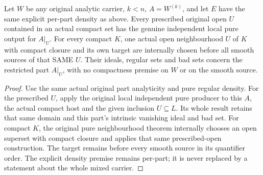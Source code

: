 \begin{theorem}
\label{hir:original-dimension-part-own-local-canonical-family}
\leanok
Let $W$ be any original analytic carrier, $k<n$, $A=W^{(k)}$,
and let $E$ have the same explicit per-part density as above.
Every prescribed original open $U$ contained in an actual compact
set has the genuine independent local pure output for $A|_U$.
For every compact $K$, one actual open neighbourhood $U$ of $K$
with compact closure and its own target are internally chosen before
all smooth sources of that SAME $U$. Their ideals, regular sets and
bad sets concern the restricted part $A|_U$, with no compactness
premise on $W$ or on the smooth source.
\end{theorem}
\begin{proof}
Use the same actual original part analyticity and pure regular density.
For the prescribed $U$, apply the original local independent pure
producer to this $A$, the actual compact host and the given inclusion
$U\subseteq L$. Its whole result retains that same domain and this
part's intrinsic vanishing ideal and bad set. For compact $K$, the
original pure neighbourhood theorem internally chooses an open
superset with compact closure and applies that same prescribed-open
construction. The target remains before every smooth source in its
quantifier order. The explicit density premise remains per-part;
it is never replaced by a statement about the whole mixed carrier.
\end{proof}
